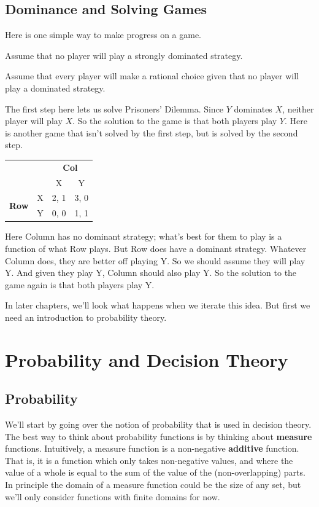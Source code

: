 \documentclass[openany]{book}
\begin{document}
\section{Dominance and Solving Games}
Here is one simple way to make progress on a game. 

\begin{enumerate*}
\item Assume that no player will play a strongly dominated strategy.
\item Assume that every player will make a rational choice given that no player will play a dominated strategy.
\end{enumerate*}
The first step here lets us solve Prisoners' Dilemma. Since $Y$ dominates $X$, neither player will play $X$. So the solution to the game is that both players play $Y$. Here is another game that isn't solved by the first step, but is solved by the second step.

\begin{center}
\begin{tabular}{l r | c c}
 & & \multicolumn{2}{c}{\textbf{Col}} \\
& & X & Y \\ \hline
\multirow{2}{*}{\textbf{Row}} & X & 2, 1 & 3, 0 \\ & Y & 0, 0 & 1, 1 \\
\end{tabular}
\end{center}
Here Column has no dominant strategy; what's best for them to play is a function of what Row plays. But Row does have a dominant strategy. Whatever Column does, they are better off playing Y. So we should assume they will play Y. And given they play Y, Column should also play Y. So the solution to the game again is that both players play Y.

In later chapters, we'll look what happens when we iterate this idea. But first we need an introduction to probability theory.

\chapter{Probability and Decision Theory}
\section{Probability}
We'll start by going over the notion of probability that is used in decision theory. The best way to think about probability functions is by thinking about \textbf{measure} functions. Intuitively, a measure function is a non-negative \textbf{additive} function. That is, it is a function which only takes non-negative values, and where the value of a whole is equal to the sum of the value of the (non-overlapping) parts. In principle the domain of a measure function could be the size of any set, but we'll only consider functions with finite domains for now.
\end{document}
